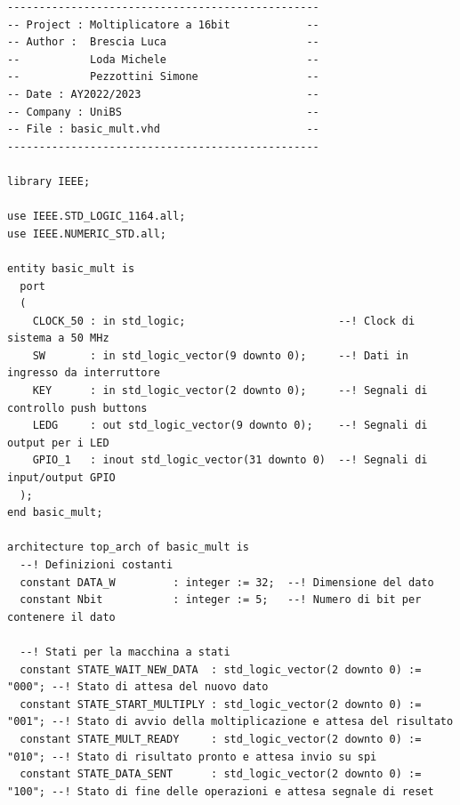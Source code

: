 \documentclass[titlepage]{report}
\begin{document}
		\begin{lstlisting}[caption={Processo principale del moltiplicatore}, label={lst:mul16_process}]
-------------------------------------------------
-- Project : Moltiplicatore a 16bit            --
-- Author :  Brescia Luca                      -- 
--           Loda Michele                      --
--           Pezzottini Simone                 --
-- Date : AY2022/2023                          --
-- Company : UniBS                             --
-- File : basic_mult.vhd                       --
-------------------------------------------------

library IEEE;

use IEEE.STD_LOGIC_1164.all;
use IEEE.NUMERIC_STD.all;

entity basic_mult is
  port
  (
    CLOCK_50 : in std_logic;                        --! Clock di sistema a 50 MHz
    SW       : in std_logic_vector(9 downto 0);     --! Dati in ingresso da interruttore
    KEY      : in std_logic_vector(2 downto 0);     --! Segnali di controllo push buttons
    LEDG     : out std_logic_vector(9 downto 0);    --! Segnali di output per i LED
    GPIO_1   : inout std_logic_vector(31 downto 0)  --! Segnali di input/output GPIO
  );
end basic_mult;

architecture top_arch of basic_mult is
  --! Definizioni costanti
  constant DATA_W         : integer := 32;  --! Dimensione del dato
  constant Nbit           : integer := 5;   --! Numero di bit per contenere il dato

  --! Stati per la macchina a stati
  constant STATE_WAIT_NEW_DATA  : std_logic_vector(2 downto 0) := "000"; --! Stato di attesa del nuovo dato
  constant STATE_START_MULTIPLY : std_logic_vector(2 downto 0) := "001"; --! Stato di avvio della moltiplicazione e attesa del risultato
  constant STATE_MULT_READY     : std_logic_vector(2 downto 0) := "010"; --! Stato di risultato pronto e attesa invio su spi
  constant STATE_DATA_SENT      : std_logic_vector(2 downto 0) := "100"; --! Stato di fine delle operazioni e attesa segnale di reset


\end{lstlisting}
\end{document}
